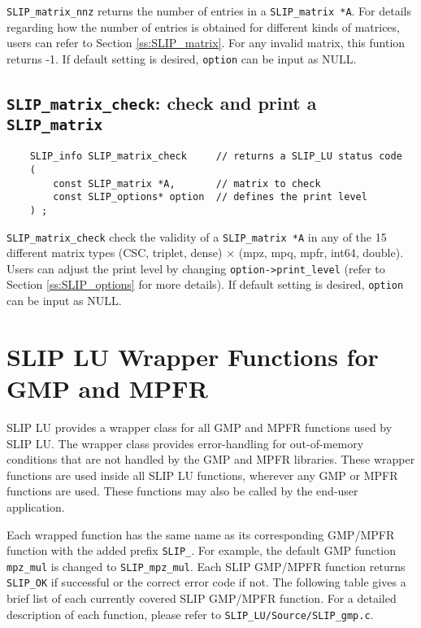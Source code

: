 \documentclass[12pt]{article}
\theoremstyle{definition}
\begin{document}
\verb|SLIP_matrix_nnz| returns the number of entries in a \verb|SLIP_matrix *A|.
For details regarding how the number of entries is obtained for different kinds
of matrices, users can refer to Section \ref{ss:SLIP_matrix}.
For any invalid matrix, this funtion returns -1.
If default setting is desired, \verb|option| can be input as NULL.


\cprotect\subsection{\verb|SLIP_matrix_check|: check and print a \verb|SLIP_matrix|}

\begin{mdframed}[userdefinedwidth=6in]
{\footnotesize
\begin{verbatim}
    SLIP_info SLIP_matrix_check     // returns a SLIP_LU status code
    (
        const SLIP_matrix *A,       // matrix to check
        const SLIP_options* option  // defines the print level
    ) ;
\end{verbatim}
} \end{mdframed}

\verb|SLIP_matrix_check| check the validity of a \verb|SLIP_matrix *A| in any
of the 15 different matrix types (CSC, triplet, dense) $\times$ (mpz, mpq,
mpfr, int64, double). Users can adjust the print level by changing
\verb|option->print_level| (refer to Section \ref{ss:SLIP_options} for more
details).
If default setting is desired, \verb|option| can be input as NULL.

\section{SLIP LU Wrapper Functions for GMP and MPFR}

SLIP LU provides a wrapper class for all GMP and MPFR functions used by SLIP
LU.  The wrapper class provides error-handling for out-of-memory conditions
that are not handled by the GMP and MPFR libraries.  These wrapper functions
are used inside all SLIP LU functions, wherever any GMP or MPFR functions are
used.  These functions may also be called by the end-user application.

Each wrapped function has the same name as its corresponding GMP/MPFR function
with the added prefix \verb|SLIP_|. For example, the default GMP function
\verb|mpz_mul| is changed to \verb|SLIP_mpz_mul|. Each SLIP GMP/MPFR function
returns \verb|SLIP_OK| if successful or the correct error code if not. The
following table gives a brief list of each currently covered SLIP GMP/MPFR
function. For a detailed description of each function, please refer to
\verb|SLIP_LU/Source/SLIP_gmp.c|.
\end{document}
